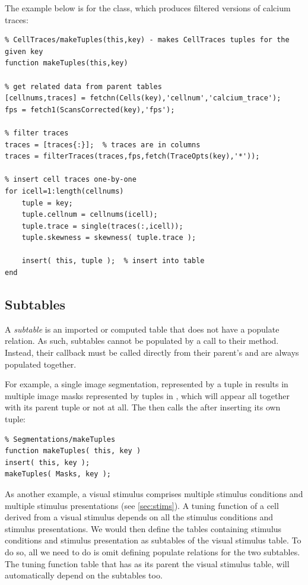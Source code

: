 \documentclass[10pt]{article}
\begin{document}
The example below is for the  class, which produces filtered versions of calcium traces:
\begin{lstlisting}
% CellTraces/makeTuples(this,key) - makes CellTraces tuples for the given key
function makeTuples(this,key)   

% get related data from parent tables
[cellnums,traces] = fetchn(Cells(key),'cellnum','calcium_trace');
fps = fetch1(ScansCorrected(key),'fps');

% filter traces
traces = [traces{:}];  % traces are in columns
traces = filterTraces(traces,fps,fetch(TraceOpts(key),'*'));

% insert cell traces one-by-one
for icell=1:length(cellnums)
    tuple = key;
    tuple.cellnum = cellnums(icell);
    tuple.trace = single(traces(:,icell));
    tuple.skewness = skewness( tuple.trace );
    
    insert( this, tuple );  % insert into table
end
\end{lstlisting}


\subsection{Subtables}\label{sec:subtables}
A {\em subtable} is an imported or computed table that does not have a populate relation. As such, subtables cannot be populated by a call to their  method. Instead, their  callback must be called directly from their parent's  and are always populated together. 

For example, a single image segmentation, represented by a tuple in  results in multiple image masks represented by tuples in , which will appear all together with its parent tuple or not at all. The  then calls the   after inserting its own tuple:
\begin{lstlisting}
% Segmentations/makeTuples
function makeTuples( this, key )
insert( this, key ); 
makeTuples( Masks, key );
\end{lstlisting}


As another example, a visual stimulus comprises multiple stimulus conditions and multiple stimulus presentations (see \autoref{sec:stims}). A tuning function of a cell derived from a visual stimulus depends on all the stimulus conditions and stimulus presentations.  We would then define the tables containing stimulus conditions and stimulus presentation as subtables of the visual stimulus table. To do so, all we need to do is omit defining populate relations for the two subtables.  The tuning function table that has as its parent the visual stimulus table, will automatically depend on the subtables too. 
\end{document}
